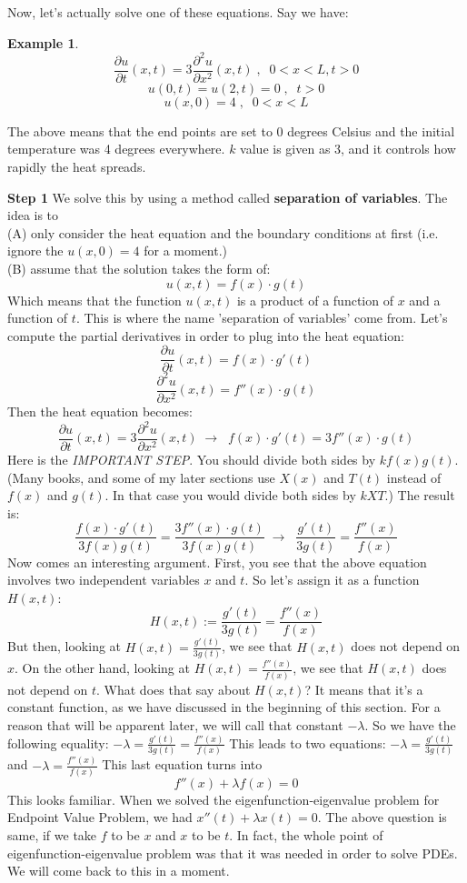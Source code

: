 \documentclass[12pt]{report}
\newtheorem{ex}{Example}[section]
\begin{document}
Now, let's actually solve one of these equations. Say we have:

\begin{ex}
$$\frac{\partial u}{\partial t}(x,t) = 3 \frac{\partial^2 u}{\partial x^2}(x,t)\; , \; \; 0<x<L, t>0$$
$$u(0,t)=u(2,t)=0 \; , \; \; t>0$$
$$u(x,0)=4  \; , \; \; 0<x<L$$
\end{ex}

The above means that the end points are set to 0 degrees Celsius and the initial temperature was 4 degrees everywhere. $k$ value is given as 3, and it controls how rapidly the heat spreads.

\textbf{Step 1} We solve this by using a method called \textbf{separation of variables}. The idea is to \\
(A) only consider the heat equation and the boundary conditions at first (i.e. ignore the $u(x,0)=4$ for a moment.) \\
(B) assume that the solution takes the form of:
$$u(x,t)= f(x)\cdot g(t)$$
Which means that the function $u(x,t)$ is a product of a function of $x$ and a function of $t$. This is where the name 'separation of variables' come from. Let's compute the partial derivatives in order to plug into the heat equation:
$$\frac{\partial u}{\partial t}(x,t) = f(x)\cdot g'(t)$$
$$\frac{\partial^2 u}{\partial x^2}(x,t) = f''(x)\cdot g(t)$$
Then the heat equation becomes:
$$\frac{\partial u}{\partial t}(x,t) = 3 \frac{\partial^2 u}{\partial x^2}(x,t)  \; \rightarrow \; \; f(x)\cdot g'(t) = 3 f''(x)\cdot g(t) $$
Here is the \textit{IMPORTANT STEP}. You should divide both sides by $k f(x) g(t)$. (Many books, and some of my later sections use $X(x)$ and $T(t)$ instead of $f(x)$ and $g(t)$. In that case you would divide both sides by $kXT$.)
The result is:
$$\frac{f(x)\cdot g'(t)}{3f(x)g(t)} = \frac{3 f''(x)\cdot g(t)}{3f(x)g(t)}  \; \rightarrow \; \; \frac{g'(t)}{3g(t)} = \frac{ f''(x)}{f(x)} $$
Now comes an interesting argument. First, you see that the above equation involves two independent variables $x$ and $t$. So let's assign it as a function $H(x,t)$:
$$H(x,t):=\frac{g'(t)}{3g(t)} = \frac{ f''(x)}{f(x)} $$
But then, looking at $H(x,t)=\frac{g'(t)}{3g(t)}$, we see that $H(x,t)$ does not depend on $x$. On the other hand, looking at $H(x,t) = \frac{ f''(x)}{f(x)} $, we see that $H(x,t)$ does not depend on $t$. What does that say about $H(x,t)$? It means that it's a constant function, as we have discussed in the beginning of this section. For a reason that will be apparent later, we will call that constant $-\lambda$. So we have the following equality:
$-\lambda=\frac{g'(t)}{3g(t)} = \frac{ f''(x)}{f(x)} $
This leads to two equations:
$-\lambda=\frac{g'(t)}{3g(t)} $
and
$-\lambda= \frac{ f''(x)}{f(x)} $
This last equation turns into
$$f''(x) + \lambda f(x) =0$$
This looks familiar. When we solved the eigenfunction-eigenvalue problem for Endpoint Value Problem, we had $x''(t) + \lambda x(t)=0$. The above question is same, if we take $f$ to be $x$ and $x$ to be $t$. In fact, the whole point of eigenfunction-eigenvalue problem was that it was needed in order to solve PDEs. We will come back to this in a moment.
\end{document}

